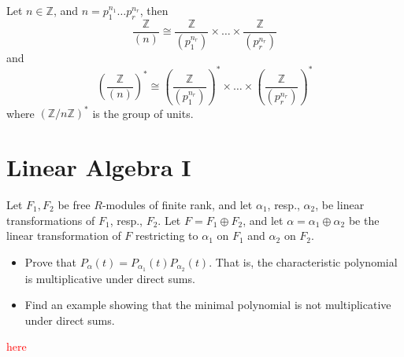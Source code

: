 \documentclass[openany]{book}
\newcommand{\Z}{\mathbb{Z}}
\begin{document}
\begin{prop}[6.8]
    Let $n\in\Z$, and $n=p_1^{n_1}\dots p_r^{n_r}$, then 
    \begin{equation*}
        \frac{\Z}{(n)}\cong\frac{\Z}{(p_1^{n_r})}\times\dots\times\frac{\Z}{(p_r^{n_r})}
    \end{equation*}
    and 
    \begin{equation*}
        \left(\frac{\Z}{(n)}\right)^*\cong\left(\frac{\Z}{(p_1^{n_r})}\right)^*\times\dots\times\left(\frac{\Z}{(p_r^{n_r})}\right)^*
    \end{equation*}
    where $(\Z/n\Z)^*$ is the group of units.
\end{prop}





























\chapter{Linear Algebra I}




\begin{prob}[6.10]
    Let \( F_1, F_2 \) be free \( R \)-modules of finite rank, and let \( \alpha_1 \), resp., \( \alpha_2 \), be linear transformations of \( F_1 \), resp., \( F_2 \). Let \( F = F_1 \oplus F_2 \), and let \( \alpha = \alpha_1 \oplus \alpha_2 \) be the linear transformation of \( F \) restricting to \( \alpha_1 \) on \( F_1 \) and \( \alpha_2 \) on \( F_2 \).

    \begin{itemize}
        \item Prove that \( P_\alpha(t) = P_{\alpha_1}(t)P_{\alpha_2}(t) \). That is, the characteristic polynomial is multiplicative under direct sums.
    
        \item Find an example showing that the minimal polynomial is not multiplicative under direct sums.
    \end{itemize}
\end{prob}
\textcolor{red}{here}
\end{document}
